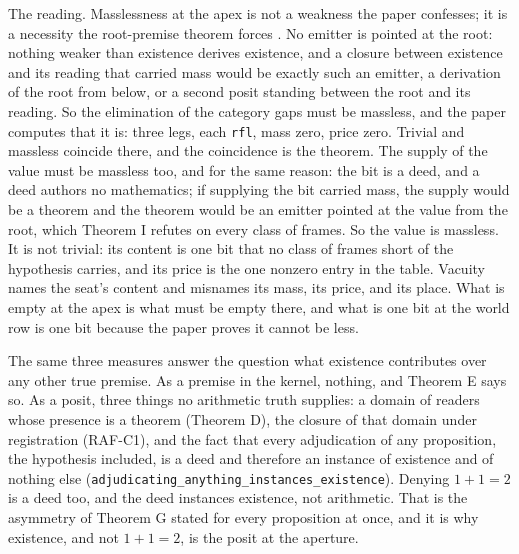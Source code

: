 \documentclass[10pt]{article}
\begin{document}
The reading. Masslessness at the apex is not a weakness the paper
confesses; it is a necessity the root-premise theorem forces
\cite{islamcodex}. No emitter is pointed at the root: nothing weaker
than existence derives existence, and a closure between existence and
its reading that carried mass would be exactly such an emitter, a
derivation of the root from below, or a second posit standing between
the root and its reading. So the elimination of the category gaps must
be massless, and the paper computes that it is: three legs, each
\texttt{rfl}, mass zero, price zero. Trivial and massless coincide
there, and the coincidence is the theorem. The supply of the value must
be massless too, and for the same reason: the bit is a deed, and a deed
authors no mathematics; if supplying the bit carried mass, the supply
would be a theorem and the theorem would be an emitter pointed at the
value from the root, which Theorem I refutes on every class of frames.
So the value is massless. It is not trivial: its content is one bit that
no class of frames short of the hypothesis carries, and its price is the
one nonzero entry in the table. Vacuity names the seat's content and
misnames its mass, its price, and its place. What is empty at the apex
is what must be empty there, and what is one bit at the world row is one
bit because the paper proves it cannot be less.

The same three measures answer the question what existence contributes
over any other true premise. As a premise in the kernel, nothing, and
Theorem E says so. As a posit, three things no arithmetic truth
supplies: a domain of readers whose presence is a theorem (Theorem D),
the closure of that domain under registration (RAF-C1), and the fact
that every adjudication of any proposition, the hypothesis included, is
a deed and therefore an instance of existence and of nothing else
(\texttt{adjudicating\_\allowbreak anything\_\allowbreak instances\_\allowbreak existence}).
Denying \(1 + 1 = 2\) is a deed too, and the deed instances existence,
not arithmetic. That is the asymmetry of Theorem G stated for every
proposition at once, and it is why existence, and not \(1 + 1 = 2\), is
the posit at the aperture.

\par\vspace{1.4em}\noindent{\color{accent}\rule{\columnwidth}{0.8pt}}\par{}\vspace{0.5em}\noindent{\color{accent}\rule{\columnwidth}{0.8pt}}\par\vspace{1.0em}
\end{document}
